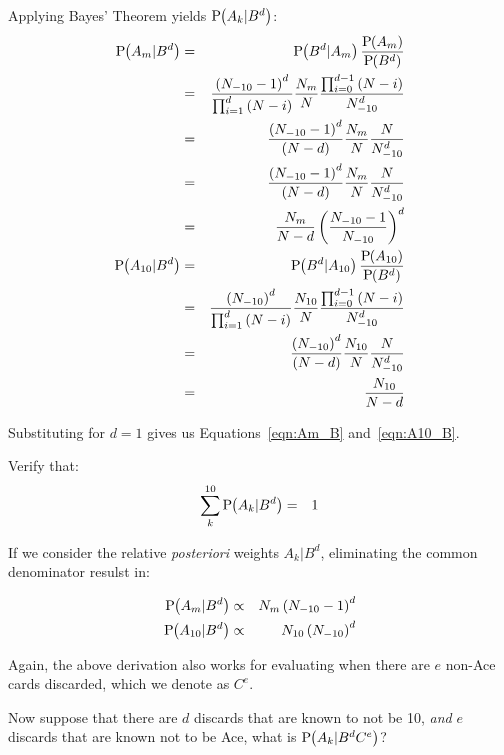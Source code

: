 \noindent
Applying Bayes' Theorem yields $\textrm{P}\hspace{-.5ex}\left(A_k|B^d\right)$:
\begin{eqnarray}
\textrm{P}\hspace{-.5ex}\left(A_m|B^d\right) &=& \textrm{P}\hspace{-.5ex}\left(B^d|A_m\right)\frac{\textrm{P}\hspace{-.5ex}\left(A_m\right)}{\textrm{P}\hspace{-.5ex}\left(B^d\right)} \nonumber \\
&=& \frac{\left(N_{-10}-1\right)^d}{\prod_{i=1}^{d}{\left(N-i\right)}}
\frac{N_m}{N} \frac{\prod_{i=0}^{d-1}{\left(N-i\right)}}{N_{-10}^d} \nonumber \\
&=& \frac{\left(N_{-10}-1\right)^d}{\left(N-d\right)}
\frac{N_m}{N} \frac{N}{N_{-10}^d} \nonumber \\
&=& \frac{\left(N_{-10}-1\right)^d}{\left(N-d\right)}
\frac{N_m}{N} \frac{N}{N_{-10}^d} \nonumber \\
&=& \frac{N_m}{N-d} \left(\frac{N_{-10}-1}{N_{-10}}\right)^d \label{eqn:Am_Bd} \\
\textrm{P}\hspace{-.5ex}\left(A_{10}|B^d\right) &=& \textrm{P}\hspace{-.5ex}\left(B^d|A_{10}\right)\frac{\textrm{P}\hspace{-.5ex}\left(A_{10}\right)}{\textrm{P}\hspace{-.5ex}\left(B^d\right)} \nonumber \\
&=& \frac{\left(N_{-10}\right)^d}{\prod_{i=1}^{d}{\left(N-i\right)}}
\frac{N_{10}}{N} \frac{\prod_{i=0}^{d-1}{\left(N-i\right)}}{N_{-10}^d} \nonumber \\
&=& \frac{\left(N_{-10}\right)^d}{\left(N-d\right)}
\frac{N_{10}}{N} \frac{N}{N_{-10}^d} \nonumber \\
&=& \frac{N_{10}}{N-d} \label{eqn:A10_Bd}
\end{eqnarray}

\noindent
Substituting for $d=1$ gives us Equations~\ref{eqn:Am_B} and~\ref{eqn:A10_B}.

\begin{exercise}
Verify that:
\begin{eqnarray}
\sum_{k}^{10}{\textrm{P}\hspace{-.5ex}\left(A_k|B^d\right)} &=& 1
\end{eqnarray}
\end{exercise}

If we consider the relative \emph{posteriori} weights $A_k|B^d$, 
eliminating the common denominator resulst in:

\begin{eqnarray}
\textrm{P}\hspace{-.5ex}\left(A_m|B^d\right) &\propto& N_m \left(N_{-10}-1\right)^d \\
\textrm{P}\hspace{-.5ex}\left(A_{10}|B^d\right) &\propto& N_{10} \left(N_{-10}\right)^d
\end{eqnarray}

Again, the above derivation also works for evaluating
when there are $e$ non-Ace cards discarded,
which we denote as $C^e$.

Now suppose that there are $d$ discards that are known to not be 10,
\emph{and} $e$ discards that are known not to be Ace, 
what is $\textrm{P}\hspace{-.5ex}\left(A_k|B^d C^e\right)$?

